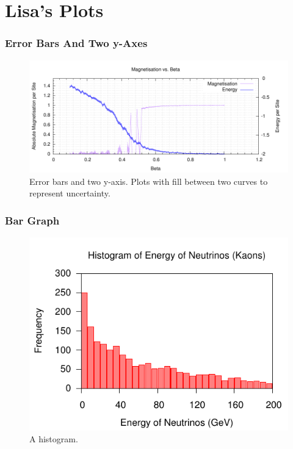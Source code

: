\documentclass[10pt,a4paper,final]{report}
\begin{document}
\part*{Lisa's Plots}
\setcounter{section}{0}

\section{Error Bars And Two y-Axes}
\begin{figure}[!hbtp]
\centering
\includegraphics[width=\textwidth]{../CodeLisa/BETAM/BETA2.pdf}
\caption{Error bars and two y-axis.  Plots with fill between two curves to represent uncertainty. }
\end{figure}


\section{Bar Graph}
\begin{figure}[!hbtp]
\centering
\includegraphics[width=\textwidth]{../CodeLisa/HIST/NEUTMOMK.pdf}
\caption{A histogram.}
\end{figure}

\end{document}
